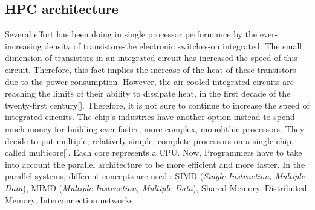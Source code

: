 \subsection{HPC architecture}
Several effort has been doing in single processor performance by the ever-increasing density of transistors-the electronic switches-on integrated. The small dimension of transistors in an integrated circuit has increased the speed of this circuit. Therefore, this fact implies the increase of the heat of these transistors due to the power consumption. However, the air-cooled integrated circuits are reaching the limits of their ability to dissipate heat, in the first decade of the twenty-first century[]. 
Therefore, it is not sure to continue to increase the speed of integrated circuits. The chip's industries have another option instead to spend much money for building ever-faster, more complex, monolithic
processors. They decide to put multiple, relatively simple, complete processors on a single chip, called multicore[]. Each core represents a CPU. Now, Programmers have to take into account the parallel architecture to be more efficient and more faster. 
In the parallel systems, different concepts are used  : SIMD (\textit{Single Instruction, Multiple Data}), MIMD (\textit{Multiple Instruction, Multiple Data}), Shared Memory, Distributed Memory, Interconnection networks 
